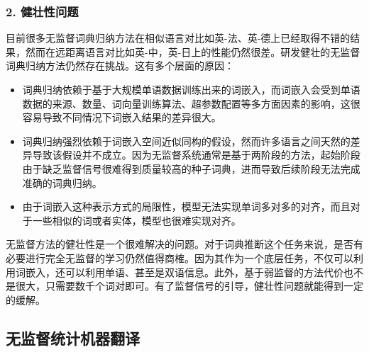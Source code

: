 \subsubsection{2. 健壮性问题}

\parinterval 目前很多无监督词典归纳方法在相似语言对比如英-法、英-德上已经取得不错的结果，然而在远距离语言对比如英-中，英-日上的性能仍然很差。研发健壮的无监督词典归纳方法仍然存在挑战。这有多个层面的原因：

\begin{itemize}
\vspace{0.5em}
\item 词典归纳依赖于基于大规模单语数据训练出来的词嵌入，而词嵌入会受到单语数据的来源、数量、词向量训练算法、超参数配置等多方面因素的影响，这很容易导致不同情况下词嵌入结果的差异很大。
\vspace{0.5em}

\item 词典归纳强烈依赖于词嵌入空间近似同构的假设，然而许多语言之间天然的差异导致该假设并不成立。因为无监督系统通常是基于两阶段的方法，起始阶段由于缺乏监督信号很难得到质量较高的种子词典，进而导致后续阶段无法完成准确的词典归纳。
\vspace{0.5em}

\item 由于词嵌入这种表示方式的局限性，模型无法实现单词多对多的对齐，而且对于一些相似的词或者实体，模型也很难实现对齐。
\vspace{0.5em}
\end{itemize}

\parinterval 无监督方法的健壮性是一个很难解决的问题。对于词典推断这个任务来说，是否有必要进行完全无监督的学习仍然值得商榷。因为其作为一个底层任务，不仅可以利用词嵌入，还可以利用单语、甚至是双语信息。此外，基于弱监督的方法代价也不是很大，只需要数千个词对即可。有了监督信号的引导，健壮性问题就能得到一定的缓解。


\subsection{无监督统计机器翻译}

